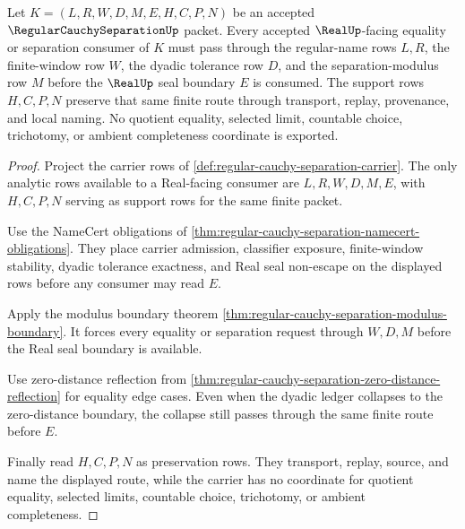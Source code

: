 \begin{theorem}
\label{thm:regular-cauchy-separation-real-seal-scope}
Let $K=(L,R,W,D,M,E,H,C,P,N)$ be an accepted $\RegularCauchySeparationUp$ packet. Every accepted $\RealUp$-facing equality or separation consumer of $K$ must pass through the regular-name rows $L,R$, the finite-window row $W$, the dyadic tolerance row $D$, and the separation-modulus row $M$ before the $\RealUp$ seal boundary $E$ is consumed. The support rows $H,C,P,N$ preserve that same finite route through transport, replay, provenance, and local naming. No quotient equality, selected limit, countable choice, trichotomy, or ambient completeness coordinate is exported.
\end{theorem}
\begin{proof}
Project the carrier rows of \autoref{def:regular-cauchy-separation-carrier}. The only analytic rows available to a Real-facing consumer are $L,R,W,D,M,E$, with $H,C,P,N$ serving as support rows for the same finite packet.

Use the NameCert obligations of \autoref{thm:regular-cauchy-separation-namecert-obligations}. They place carrier admission, classifier exposure, finite-window stability, dyadic tolerance exactness, and Real seal non-escape on the displayed rows before any consumer may read $E$.

Apply the modulus boundary theorem \autoref{thm:regular-cauchy-separation-modulus-boundary}. It forces every equality or separation request through $W,D,M$ before the Real seal boundary is available.

Use zero-distance reflection from \autoref{thm:regular-cauchy-separation-zero-distance-reflection} for equality edge cases. Even when the dyadic ledger collapses to the zero-distance boundary, the collapse still passes through the same finite route before $E$.

Finally read $H,C,P,N$ as preservation rows. They transport, replay, source, and name the displayed route, while the carrier has no coordinate for quotient equality, selected limits, countable choice, trichotomy, or ambient completeness.
\end{proof}


